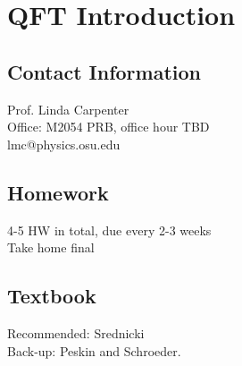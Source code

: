 \documentclass{article}
\begin{document}
\section*{QFT Introduction} 
\subsection*{Contact Information}
Prof. Linda Carpenter \\
Office: M2054 PRB, office hour TBD\\ 
lmc@physics.osu.edu
\subsection*{Homework}
4-5 HW in total, due every 2-3 weeks \\
Take home final 
\subsection*{Textbook}
Recommended: Srednicki \\ 
Back-up: Peskin and Schroeder.
\end{document}
